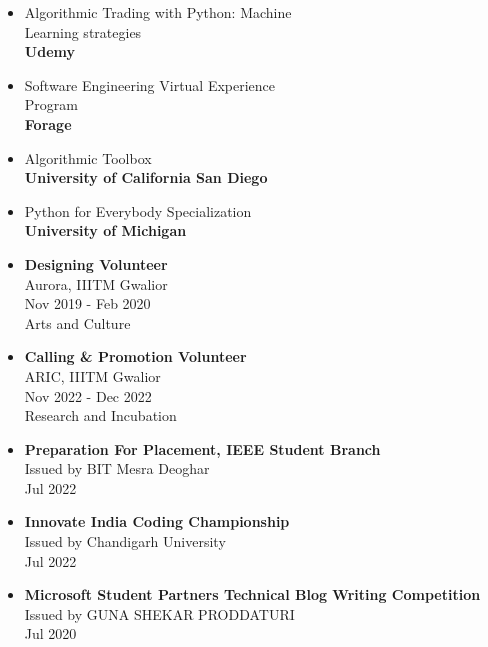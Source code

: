 \documentclass[10pt,a4paper,ragged2e,withhyper,total={8.3in, 11.7in}]{altacv}
\begin{document}
\begin{paracol}{2}
\begin{description}
    \end{description}

\begin{itemize}
    \item Algorithmic Trading with Python: Machine\\
        Learning strategies\\
        \textbf{Udemy}
    \item Software Engineering Virtual Experience
            \\Program \\
    \textbf{Forage}
    \item Algorithmic Toolbox \\ 
    \textbf{University of California San Diego} 
    \item Python for Everybody Specialization \\ 
    \textbf{University of Michigan}
\end{itemize}

\begin{itemize}
    \item \textbf{Designing Volunteer}\\
Aurora, IIITM Gwalior\\
Nov 2019 - Feb 2020\\
Arts and Culture\\

    \item \textbf{Calling \& Promotion Volunteer}\\
ARIC, IIITM Gwalior\\
Nov 2022 - Dec 2022\\
Research and Incubation\\

\end{itemize}
\begin{itemize}

    \item \textbf{Preparation For Placement, IEEE Student Branch}\\
Issued by BIT Mesra Deoghar\\ Jul 2022

    \item \textbf{Innovate India Coding Championship}\\
Issued by Chandigarh University \\ Jul 2022

    \item \textbf{Microsoft Student Partners Technical Blog Writing Competition}\\
Issued by GUNA SHEKAR PRODDATURI \\Jul 2020

\end{itemize}
\end{paracol}
\end{document}
